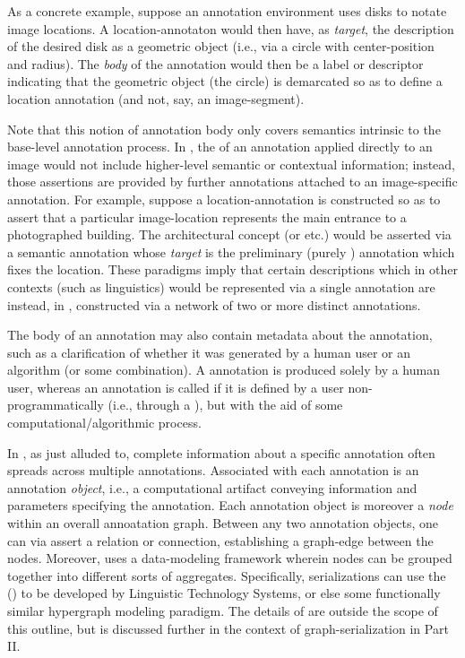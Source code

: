 {\begin{description}
As a concrete example, suppose an annotation environment 
uses disks to notate image locations.  A location-annotaton 
would then have, as \textit{target}, the description 
of the desired disk as a geometric object (i.e., 
via a circle with center-position and radius).  
The \textit{body} of the annotation would then 
be a label or descriptor indicating that the 
geometric object (the circle) is demarcated 
so as to define a location annotation (and not, 
say, an image-segment).

Note that this notion of annotation body only 
covers semantics intrinsic to the base-level 
annotation process.  In \AXFI{}, the  
of an annotation applied directly to an 
image would not include higher-level semantic 
or contextual information; instead, those 
assertions are provided by further annotations 
attached to an image-specific annotation.  For 
example, suppose a location-annotation is 
constructed so as to assert that a particular 
image-location represents the main entrance to 
a photographed building.  The architectural 
concept  (or  etc.) 
would be asserted via a semantic annotation 
whose \textit{target} is the preliminary 
(purely ) annotation which fixes 
the location.  These paradigms imply that certain 
descriptions which in other contexts (such 
as linguistics) would be represented via 
a single annotation are instead, in \AXFI{}, 
constructed via a network of two or 
more distinct annotations.

\label{ph:man}The body of an annotation 
may also contain metadata about the annotation, 
such as a clarification of whether it was 
generated by a human user or an algorithm 
(or some combination).  A  annotation 
is produced solely by a human user, whereas 
an annotation is called  
if it is defined by a user non-programmatically 
(i.e., through a \GUI{}), but with the aid of 
some computational/algorithmic process. 

\item[Annotation Graphs]  In \AXFI{}, as 
just alluded to, complete information about 
a specific annotation often spreads 
across multiple annotations.  
Associated with each annotation is an 
annotation \textit{object}, i.e., a 
computational artifact conveying information 
and parameters specifying the annotation.  
Each annotation object is moreover a \textit{node} 
within an overall annoatation graph.  Between 
any two annotation objects, one can via 
\AXFI{} assert a relation or connection, 
establishing a graph-edge between the nodes.  
Moreover, \AXFI{} uses a  
data-modeling framework wherein nodes 
can be grouped together into different sorts 
of aggregates.  Specifically, \AXFI{} 
serializations can use the  (\HGXF{}) to be developed 
by Linguistic Technology Systems, or 
else some functionally similar hypergraph 
modeling paradigm.  The details of 
\HGXF{} are outside the scope of this 
outline, but \HGXF{} is discussed further 
in the context of graph-serialization in 
Part II.  


\end{description}}
